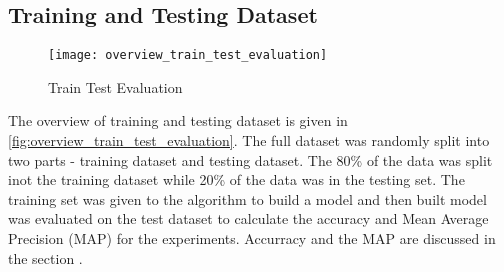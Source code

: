 \subsection{Training and Testing Dataset}
\label{sec:traintest}
\begin{singlespace}
\begin{figure}[H]
	\centering
	\texttt{[image: overview\_train\_test\_evaluation]}
	\caption{Train Test Evaluation }
	\label{fig:overview_train_test_evaluation}
\end{figure}  
\end{singlespace}
The overview of training and testing dataset is given in \autoref{fig:overview_train_test_evaluation}. The full dataset was randomly split into
two parts - training dataset and testing dataset. The 80\% of the data was split inot the training dataset while 20\% of the data was in the testing set.  
The training set was given to the algorithm to build a model and then built model was evaluated on the test dataset to calculate the accuracy and Mean Average Precision (MAP) for the experiments. Accurracy and the MAP are discussed in the section .
































